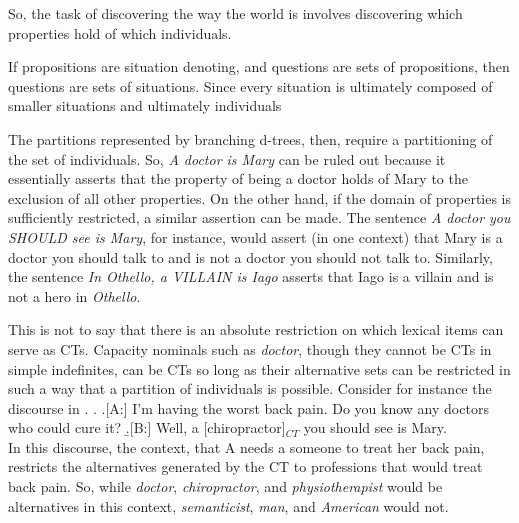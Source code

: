 \documentclass[GPFinal]{subfiles}
\begin{document}
So, the task of discovering the way the world is involves discovering which properties hold of which individuals.

If propositions are situation denoting, and questions are sets of propositions, then questions are sets of situations.
Since every situation is ultimately composed of smaller situations and ultimately individuals

The partitions represented by branching d-trees, then, require a partitioning of the set of individuals.
So, \textit{A doctor is Mary} can be ruled out because it essentially asserts that the property of being a doctor holds of Mary to the exclusion of all other properties.
On the other hand, if the domain of properties is sufficiently restricted, a similar assertion can be made.
The sentence \textit{A doctor you SHOULD see is Mary}, for instance, would assert (in one context) that Mary is a doctor you should talk to and is not a doctor you should not talk to.
Similarly, the sentence \textit{In Othello, a VILLAIN is Iago} asserts that Iago is a villain and is not a hero in \textit{Othello}.

This is not to say that there is an absolute restriction on which lexical items can serve as CTs.
Capacity nominals such as \textit{doctor}, though they cannot be CTs in simple indefinites, can be CTs so long as their alternative sets can be restricted in such a way that a partition of individuals is possible.
Consider for instance the discourse in \Next.
\ex.
\a.[A:] I'm having the worst back pain. Do you know any doctors who could cure it?
\b.[B:] Well, a [chiropractor]$_{CT}$ you should see is Mary.\\

In this discourse, the context, that A needs a someone to treat her back pain, restricts the alternatives generated by the CT to professions that would treat back pain.
So, while \textit{doctor}, \textit{chiropractor}, and \textit{physiotherapist} would be alternatives in this context, \textit{semanticist}, \textit{man}, and \textit{American} would not.
\end{document}
